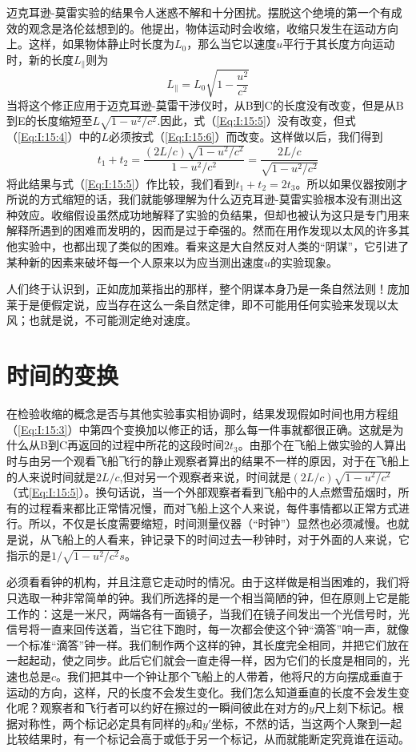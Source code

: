 迈克耳逊-莫雷实验的结果令人迷惑不解和十分困扰。摆脱这个绝境的第一个有成效的观念是洛伦兹想到的。他提出，物体运动时会收缩，收缩只发生在运动方向上。这样，如果物体静止时长度为$L_0$，那么当它以速度$u$平行于其长度方向运动时，新的长度$L_\parallel$则为
\begin{equation}
    \label{Eq:I:15:6}
    L_\parallel = L_0 \sqrt{1-\frac{u^2}{c^2}}
\end{equation}
当将这个修正应用于迈克耳逊-莫雷干涉仪时，从B到C的长度没有改变，但是从B到E的长度缩短至$L\sqrt{1-u^2/c^2}$.因此，式（\ref{Eq:I:15:5}）没有改变，但式（\ref{Eq:I:15:4}）中的$L$必须按式（\ref{Eq:I:15:6}）而改变。这样做以后，我们得到
\begin{equation}
    \label{Eq:I:15:7}
    t_1 + t_2 = \frac{(2L/c)\sqrt{1-u^2/c^2}}{1-u^2/c^2}=\frac{2L/c}{\sqrt{1-u^2/c^2}}
\end{equation}
将此结果与式（\ref{Eq:I:15:5}）作比较，我们看到$t_1+t_2=2t_3$。所以如果仪器按刚才所说的方式缩短的话，我们就能够理解为什么迈克耳逊-莫雷实验根本没有测出这种效应。收缩假设虽然成功地解释了实验的负结果，但却也被认为这只是专门用来解释所遇到的困难而发明的，因而是过于牵强的。然而在用作发现以太风的许多其他实验中，也都出现了类似的困难。看来这是大自然反对人类的“阴谋”，它引进了某种新的因素来破坏每一个人原来以为应当测出速度$u$的实验现象。

人们终于认识到，正如庞加莱指出的那样，整个阴谋本身乃是一条自然法则！庞加莱于是便假定说，应当存在这么一条自然定律，即不可能用任何实验来发现以太风；也就是说，不可能测定绝对速度。

\section{时间的变换}

在检验收缩的概念是否与其他实验事实相协调时，结果发现假如时间也用方程组（\ref{Eq:I:15:3}）中第四个变换加以修正的话，那么每一件事就都很正确。这就是为什么从B到C再返回的过程中所花的这段时间$2t_3$。由那个在飞船上做实验的人算出时与由另一个观看飞船飞行的静止观察者算出的结果不一样的原因，对于在飞船上的人来说时间就是$2L/c$,但对另一个观察者来说，时间就是$(2L/c){\sqrt{1-u^2/c^2}}$（式\ref{Eq:I:15:5}）。换句话说，当一个外部观察者看到飞船中的人点燃雪茄烟时，所有的过程看来都比正常情况慢，而对飞船上这个人来说，每件事情都以正常方式进行。所以，不仅是长度需要缩短，时间测量仪器（“时钟”）显然也必须减慢。也就是说，从飞船上的人看来，钟记录下的时间过去一秒钟时，对于外面的人来说，它指示的是$1/\sqrt{1-u^2/c^2}s$。

必须看看钟的机构，并且注意它走动时的情况。由于这样做是相当困难的，我们将只选取一种非常简单的钟。我们所选择的是一个相当简陋的钟，但在原则上它是能工作的：这是一米尺，两端各有一面镜子，当我们在镜子间发出一个光信号时，光信号将一直来回传送着，当它往下跑时，每一次都会使这个钟“滴答”响一声，就像一个标准“滴答”钟一样。我们制作两个这样的钟，其长度完全相同，并把它们放在一起起动，使之同步。此后它们就会一直走得一样，因为它们的长度是相同的，光速也总是$c$。我们把其中一个钟让那个飞船上的人带着，他将尺的方向摆成垂直于运动的方向，这样，尺的长度不会发生变化。我们怎么知道垂直的长度不会发生变化呢？观察者和飞行者可以约好在擦过的一瞬间彼此在对方的$y$尺上刻下标记。根据对称性，两个标记必定具有同样的$y$和$y'$坐标，不然的话，当这两个人聚到一起比较结果时，有一个标记会高于或低于另一个标记，从而就能断定究竟谁在运动。

